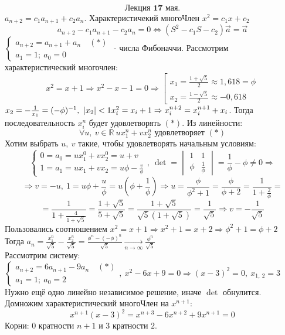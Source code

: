\documentclass[12pt, letterpaper, twoside]{article}
\newcommand{\DS}{\displaystyle}
\newcommand{\mb}[1]{\mathbb{#1}}
\begin{document}
\[\textbf{Лекция 17 мая.}\]
$a_{n + 2} = c_1 a_{n + 1} + c_2 a_n$. Характеристичекий многоЧлен $x^2 = c_1 x + c_2$
\[a_{n + 2} - c_1 a_{n + 1} - c_2 a_n = 0\Leftrightarrow (S^2 - c_1 S - c_2)\vec{a} = \vec{a}\]
$\begin{cases}
    a_{n + 2} = a_{n + 1} + a_n\quad (*)\\
    a_1 = 1;\ a_0 = 0
\end{cases}$ - числа Фибоначчи. Рассмотрим характеристический многочлен:
\[x^2 = x + 1\Rightarrow x^2 - x - 1 = 0\Rightarrow \left[\begin{gathered}
    x_1 = \frac{1 + \sqrt{5}}{2}\approx 1,618 = \phi\\
    x_2 = \frac{1 - \sqrt{5}}{2}\approx -0,618
\end{gathered}\right.\]
$x_2 = -\frac{1}{x_1} = (-\phi)^{-1},\ |x_2| < 1\\
x_i^2 = x_i + 1\Rightarrow x_i^{n + 2} = x_i^{n + 1} + x_i$. Тогда последовательность $x_i^n$ будет удовлетворять $(*)$. Из линейности:
\[\forall u,\ v\in \mb{R}\ ux_1^n + vx_2^n\text{ удовлетворяет $(*)$}\]
Хотим выбрать $u,\ v$ такие, чтобы удовлетворять начальным условиям:
\[\begin{cases}
    0  = a_0 = ux_1^0 + vx_2^0 = u + v\\
    1 = a_1 = ux_1 + vx_2 = u\phi - \frac{v}{\phi}
\end{cases},\ \det = \begin{vmatrix}
    1 & 1\\
    \phi & \frac{1}{\phi}
\end{vmatrix} = \frac{1}{\phi} - \phi \neq 0\Rightarrow\]
\[\Rightarrow v = -u,\ 1 = u\phi + \frac{u}{\phi} = u\left(\phi  +\frac{1}{\phi}\right)\Rightarrow u = \frac{\phi}{\phi^2 + 1} = \frac{\phi}{\phi + 2} = \frac{1}{1 + \frac{2}{\phi}}=\]
\[= \frac{1}{1 + \frac{4}{1 + \sqrt{5}}} = \frac{1 + \sqrt{5}}{5 + \sqrt{5}} = \frac{1 + \sqrt{5}}{\sqrt{5}(1 + \sqrt{5})} = \frac{1}{\sqrt{5}}\Rightarrow v = -\frac{1}{\sqrt{5}}\]
Пользовались соотношением $x^2 = x + 1\Rightarrow x^2 + 1 = x + 2\Rightarrow \phi^2 + 1 = \phi + 2$\\
Тогда $\DS a_n = \frac{x_1^n}{\sqrt{5}} - \frac{x_2^n}{\sqrt{5}} = \frac{\phi^n - (-\phi)^n}{\sqrt{5}} \xrightarrow[n\to \infty]{} \frac{\phi^n}{\sqrt{5}}$\\
Рассмотрим систему:
$\begin{cases}
    a_{n + 2} = 6a_{n + 1} - 9 a_n\quad (*)\\
    a_1 = 1;\ a_0 = 2
\end{cases},\ x^2 - 6x + 9 = 0\Rightarrow (x - 3)^2 = 0,\ x_{1,\ 2} = 3$ Нужно ещё одно линейно независимое решение, иначе $\det$ обнулится. Домножим характеристический многоЧлен на $x^{n + 1}$:
\[x^{n + 1}(x - 3)^2 = x^{n + 3} - 6x^{n + 2} + 9x^{n + 1} = 0\]
Корни: $0$ кратности $n + 1$ и $3$ кратности $2$.
\end{document}
